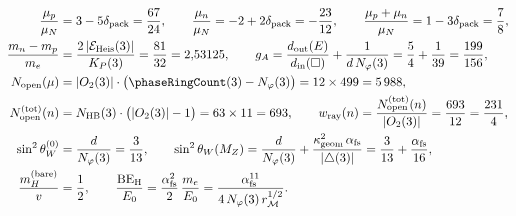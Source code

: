 \begin{theorem}
\begin{enumerate}[label=\textbf{(\arabic*)},leftmargin=*]
  \begin{align}
    \frac{\mu_p}{\mu_N} &= 3 - 5\delta_{\mathrm{pack}} = \frac{67}{24}, \qquad
    \frac{\mu_n}{\mu_N} = -2 + 2\delta_{\mathrm{pack}} = -\frac{23}{12}, \qquad
    \frac{\mu_p + \mu_n}{\mu_N} = 1 - 3\delta_{\mathrm{pack}} = \frac{7}{8}, \label{eq:mono-nucleon-moments} \\
    \frac{m_n - m_p}{m_e} &= \frac{2\,|\mathcal{E}_{\mathrm{Heis}}(3)|}{K_P(3)} = \frac{81}{32} = 2{,}53125, \qquad
    g_A = \frac{d_{\mathrm{out}}(E)}{d_{\mathrm{in}}(\square)} + \frac{1}{d\,N_\varphi(3)} = \frac{5}{4} + \frac{1}{39} = \frac{199}{156}, \label{eq:mono-weak-decays} \\
    N_{\mathrm{open}}(\mu) &= |O_2(3)|\cdot\bigl(\phaseRingCount(3) - N_\varphi(3)\bigr) = 12 \times 499 = 5\,988, \label{eq:mono-muon-channels} \\
    N_{\mathrm{open}}^{(\mathrm{tot})}(n) &= N_{\mathrm{HB}}(3)\cdot\bigl(|O_2(3)| - 1\bigr) = 63 \times 11 = 693, \qquad
    w_{\mathrm{ray}}(n) = \frac{N_{\mathrm{open}}^{(\mathrm{tot})}(n)}{|O_2(3)|} = \frac{693}{12} = \frac{231}{4}, \label{eq:mono-neutron-channels} \\
    \sin^2\theta_W^{(0)} &= \frac{d}{N_\varphi(3)} = \frac{3}{13}, \qquad
    \sin^2\theta_W(M_Z) = \frac{d}{N_\varphi(3)} + \frac{\kappa_{\mathrm{geom}}^2\,\alpha_{\mathrm{fs}}}{|{\triangle}(3)|} = \frac{3}{13} + \frac{\alpha_{\mathrm{fs}}}{16}, \label{eq:mono-weinberg-dressed} \\
    \frac{m_H^{(\mathrm{bare})}}{v} &= \frac{1}{2}, \qquad
    \frac{\mathrm{BE}_{\mathrm{H}}}{E_0} = \frac{\alpha_{\mathrm{fs}}^2}{2}\,\frac{m_e}{E_0} = \frac{\alpha_{\mathrm{fs}}^{11}}{4\,N_\varphi(3)\,r_{\mathcal{M}}^{1/2}}. \label{eq:mono-bosons-hydrogen}
  \end{align}
\end{enumerate}
\end{theorem}

